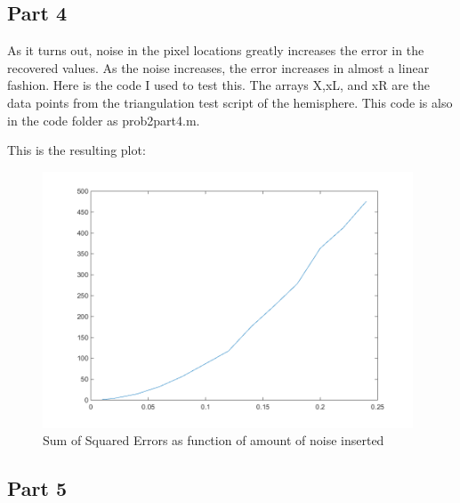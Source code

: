\documentclass[11pt,psfig]{article}
\begin{document}
\subsection*{Part 4}

As it turns out, noise in the pixel locations greatly increases the error in the recovered values. As the noise increases, the error increases in almost a linear fashion. Here is the code I used to test this. The arrays X,xL, and xR are the data points from the triangulation test script of the hemisphere. This code is also in the code folder as prob2part4.m.

This is the resulting plot:
\begin{figure}[H]
\centering
\includegraphics[height=3in]{prob2part4plot.png}
\caption{Sum of Squared Errors as function of amount of noise inserted}
\end{figure}

\newpage

\subsection*{Part 5}
\end{document}
